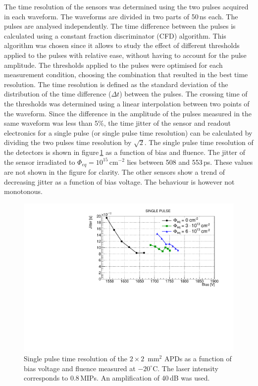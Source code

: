 \documentclass[review,number,sort&compress]{elsarticle}
\begin{document}
The time resolution of the sensors was determined using the two pulses acquired in each waveform.
The waveforms are divided in two parts of 50\,ns each.
The pulses are analysed independently.
The time difference between the pulses is calculated using a constant fraction discriminator (CFD) algorithm.
This algorithm was chosen since it allows to study the effect of different thresholds applied to the pulses with relative ease, without having to account for the pulse amplitude.
The thresholds applied to the pulses were optimised for each measurement condition, choosing the combination that resulted in the best time resolution.
The time resolution is defined as the standard deviation of the distribution of the time difference ($\Delta t$) between the pulses.
The crossing time of the thresholds was determined using a linear interpolation between two points of the waveform.
Since the difference in the amplitude of the pulses measured in the same waveform was less than 5\%, the time jitter of the sensor and readout electronics for a single pulse (or single pulse time resolution) can be calculated by dividing the two pulses time resolution by $\sqrt{2}$.
The single pulse time resolution of the detectors is shown in figure\,\ref{fig:timeRes2x2} as a function of bias and fluence.
The jitter of the sensor irradiated to $\Phi_{eq} = 10^{15}$\,cm$^{-2}$ lies between 508 and 553\,ps.
These values are not shown in the figure for clarity.
The other sensors show a trend of decreasing jitter as a function of bias voltage.
The behaviour is however not monotonous.

\begin{figure}
  \centering
  \includegraphics[width = 0.6 \columnwidth]{timeRes2x2APDsNo1e15}
  \caption{Single pulse time resolution of the $2 \times 2$~mm$^2$ APDs as a function of bias voltage and fluence measured at $-20^\circ$C. The laser intensity corresponds to 0.8\,MIPs. An amplification of 40\,dB was used.}
  \label{fig:timeRes2x2}
\end{figure}
\end{document}
